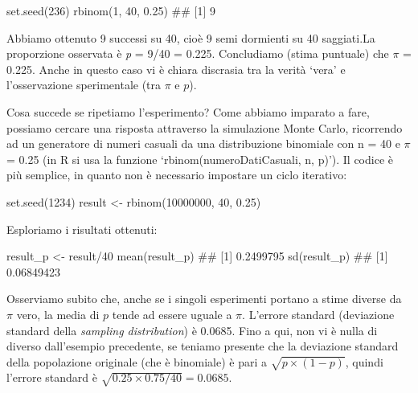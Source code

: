 \documentclass[a4paper,12pt,oneside]{book}
\newenvironment{Shaded}{\begin{snugshade}}{\end{snugshade}}
\newcommand{\DecValTok}[1]{#1}
\newcommand{\FloatTok}[1]{#1}
\newcommand{\SpecialCharTok}[1]{#1}
\newcommand{\DocumentationTok}[1]{#1}
\newcommand{\OtherTok}[1]{#1}
\newcommand{\FunctionTok}[1]{#1}
\newcommand{\NormalTok}[1]{#1}
\begin{document}
\begin{Shaded}
\begin{Highlighting}[]
\FunctionTok{set.seed}\NormalTok{(}\DecValTok{236}\NormalTok{)}
\FunctionTok{rbinom}\NormalTok{(}\DecValTok{1}\NormalTok{, }\DecValTok{40}\NormalTok{, }\FloatTok{0.25}\NormalTok{)}
\DocumentationTok{\#\# [1] 9}
\end{Highlighting}
\end{Shaded}

Abbiamo ottenuto 9 successi su 40, cioè 9 semi dormienti su 40 saggiati.La proporzione osservata è \emph{p} = 9/40 = 0.225. Concludiamo (stima puntuale) che \(\pi\) = 0.225. Anche in questo caso vi è chiara discrasia tra la verità `vera' e l'osservazione sperimentale (tra \(\pi\) e \(p\)).

Cosa succede se ripetiamo l'esperimento? Come abbiamo imparato a fare, possiamo cercare una risposta attraverso la simulazione Monte Carlo, ricorrendo ad un generatore di numeri casuali da una distribuzione binomiale con n = 40 e \(\pi\) = 0.25 (in R si usa la funzione `rbinom(numeroDatiCasuali, n, p)'). Il codice è più semplice, in quanto non è necessario impostare un ciclo iterativo:

\begin{Shaded}
\begin{Highlighting}[]
\FunctionTok{set.seed}\NormalTok{(}\DecValTok{1234}\NormalTok{)}
\NormalTok{result }\OtherTok{\textless{}{-}} \FunctionTok{rbinom}\NormalTok{(}\DecValTok{10000000}\NormalTok{, }\DecValTok{40}\NormalTok{, }\FloatTok{0.25}\NormalTok{)}
\end{Highlighting}
\end{Shaded}

Esploriamo i risultati ottenuti:

\begin{Shaded}
\begin{Highlighting}[]
\NormalTok{result\_p }\OtherTok{\textless{}{-}}\NormalTok{ result}\SpecialCharTok{/}\DecValTok{40}
\FunctionTok{mean}\NormalTok{(result\_p)}
\DocumentationTok{\#\# [1] 0.2499795}
\FunctionTok{sd}\NormalTok{(result\_p)}
\DocumentationTok{\#\# [1] 0.06849423}
\end{Highlighting}
\end{Shaded}

Osserviamo subito che, anche se i singoli esperimenti portano a stime diverse da \(\pi\) vero, la media di \(p\) tende ad essere uguale a \(\pi\). L'errore standard (deviazione standard della \emph{sampling distribution}) è 0.0685. Fino a qui, non vi è nulla di diverso dall'esempio precedente, se teniamo presente che la deviazione standard della popolazione originale (che è binomiale) è pari a \(\sqrt{p \times (1 - p)}\), quindi l'errore standard è \(\sqrt{0.25 \times 0.75 / 40} = 0.0685\).
\end{document}
